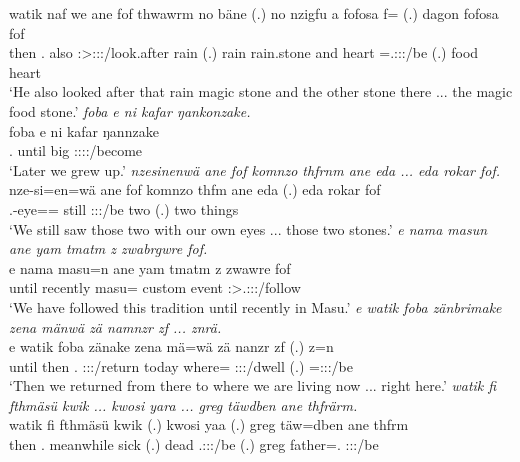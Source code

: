 \begin{exe}
	\gll watik naf we ane fof thwawrm no bäne (.) no nzigfu a fofosa f= (.) dagon fofosa fof\\ 
	then \Tsg.\Erg{} also \Dem{} \Emph{} \Sg:\Sbj>\Stpl:\Obj:\Pst:\Dur/look.after rain \Recog{} (.) rain rain.stone and heart \Dist=\Tsg.\F:\Sbj:\Nonpast:\Ipfv/be (.) food heart \Emph{}\\
	\trans `He also looked after that rain magic stone and the other stone there ... the magic food stone.'
	\emph{foba e ni kafar ŋankonzake.}\\
	\gll foba e ni kafar ŋannzake\\ 
	\Dist.\Abl{} until \Fnsg{} big \Fpl:\Sbj:\Nonpast:\Ipfv:\Venit/become\\
	\trans `Later we grew up.'
	\emph{nzesinenwä ane fof komnzo thfrnm ane eda ... eda rokar fof.}\\
	\gll nze-si=en=wä ane fof komnzo thfm ane eda (.) eda rokar fof\\ 
	\Fnsg.\Poss-eye=\Loc=\Emph{} \Dem{} \Emph{} still \Stdu:\Sbj:\Pst:\Dur/be \Dem{} two (.) two things \Emph\\
	\trans `We still saw those two with our own eyes ... those two stones.'
	\emph{e nama masun ane yam tmatm z zwabrgwre fof.}\\
	\gll e nama masu=n ane yam tmatm z zwawre fof\\ 
	until recently masu=\Loc{} \Dem{} custom event \Iam{} \Fpl:\Sbj>\Tsg.\F:\Obj:\Rpst:\Ipfv/follow \Emph\\
	\trans `We have followed this tradition until recently in Masu.'
	\emph{e watik foba zänbrimake zena mänwä zä namnzr zf ... znrä.}\\
	\gll e watik foba zänake zena mä=wä zä nanzr zf (.) z=n\\ 
	until then \Dist.\Abl{} \Fpl:\Sbj:\Rpst:\Pfv/return today where=\Emph{} \Prox{} \Fpl:\Sbj:\Nonpast:\Ipfv/dwell \Imm{} (.) \Prox=\Fpl:\Sbj:\Nonpast:\Ipfv/be\\
	\trans `Then we returned from there to where we are living now ... right here.'
	\emph{watik fi fthmäsü kwik ... kwosi yara ... greg täwdben ane thfrärm.}\\
	\gll watik fi fthmäsü kwik (.) kwosi yaa (.) greg täw=dben ane thfrm\\ 
	then \Third.\Abs{} meanwhile sick (.) dead \Tsg.\Masc:\Sbj:\Pst:\Ipfv/be (.) greg father=\Loc.\Sg{} \Dem{} \Stpl:\Sbj:\Pst:\Dur/be\\\

\end{exe}
